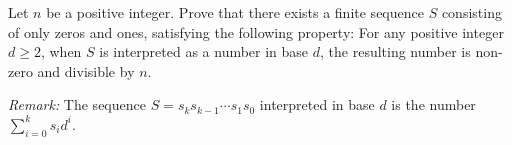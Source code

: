 Let $n$ be a positive integer.
Prove that there exists a finite sequence $S$ consisting of only zeros and ones,
satisfying the following property:
For any positive integer $d\geq 2$, when $S$ is interpreted as a number in base $d$,
the resulting number is non-zero and divisible by $n$.

\emph{Remark:} The sequence $S = s_ks_{k-1}\cdots s_1s_0$ interpreted in base $d$ is
the number $\sum_{i = 0}^k s_id^i$.
